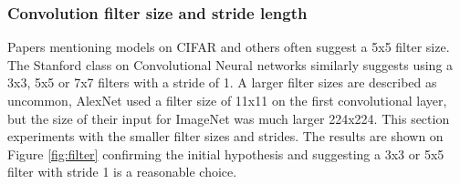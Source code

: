 \documentclass[12pt]{article}
\begin{document}
\subsubsection*{Convolution filter size and stride length}

Papers\cite{kernel}\cite{inspiration}\cite{bestprac} mentioning models on CIFAR and others often suggest a 5x5 filter size. The Stanford class on Convolutional Neural networks\cite{stan} similarly suggests using a 3x3, 5x5 or 7x7 filters with a stride of 1. A larger filter sizes are described as uncommon, AlexNet\cite{alexnet} used a filter size of 11x11 on the first convolutional layer, but the size of their input for ImageNet was much larger 224x224. This section experiments with the smaller filter sizes and strides. The results are shown on Figure \ref{fig:filter} confirming the initial hypothesis and suggesting a 3x3 or 5x5 filter with stride 1 is a reasonable choice. 
\end{document}
